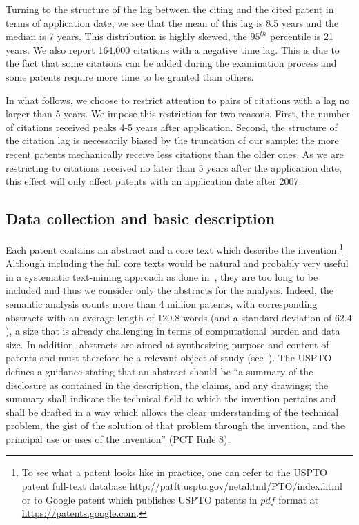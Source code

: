 \documentclass[article]{article}%
\begin{document}
Turning to the structure of the lag between the citing and the cited patent in terms of application date, we see that the mean of this lag is 8.5 years and the median is 7 years. This distribution is highly skewed, the $95^{th}$ percentile is 21 years. We also report 164,000 citations with a negative time lag. This is due to the fact that some citations can be added during the examination process and some patents require more time to be granted than others.

In what follows, we choose to restrict attention to pairs of citations with a lag no larger than 5 years. We impose this restriction for two reasons. First, the number of citations received peaks 4-5 years after application. Second, the structure of the citation lag is necessarily biased by the truncation of our sample: the more recent patents mechanically receive less citations than the older ones. As we are restricting to citations received no later than 5 years after the application date, this effect will only affect patents with an application date after 2007.

\subsection{Data collection and basic description}
Each patent contains an abstract and a core text which describe the invention.\footnote{To see what a patent looks like in practice, one can refer to the USPTO patent full-text database \url{http://patft.uspto.gov/netahtml/PTO/index.html} or to Google patent which publishes USPTO patents in $pdf$ format at \url{https://patents.google.com}.} Although including the full core texts would be natural and probably very useful in a systematic text-mining approach as done in~\cite{tseng2007text}, they are too long to be included and thus we consider only the abstracts for the analysis. Indeed, the semantic analysis counts more than 4 million patents, with corresponding abstracts with an average length of 120.8 words (and a standard deviation of $62.4$), a size that is already challenging in terms of computational burden and data size. In addition, abstracts are aimed at synthesizing purpose and content of patents and must therefore be a relevant object of study (see~\citealt{Adams2010text}). The USPTO defines a guidance stating that an abstract should be ``a summary of the disclosure as contained in the description, the claims, and any drawings; the summary shall indicate the technical field to which the invention pertains and shall be drafted in a way which allows the clear understanding of the technical problem, the gist of the solution of that problem through the invention, and the principal use or uses of the invention'' (PCT Rule 8). 
\end{document}
